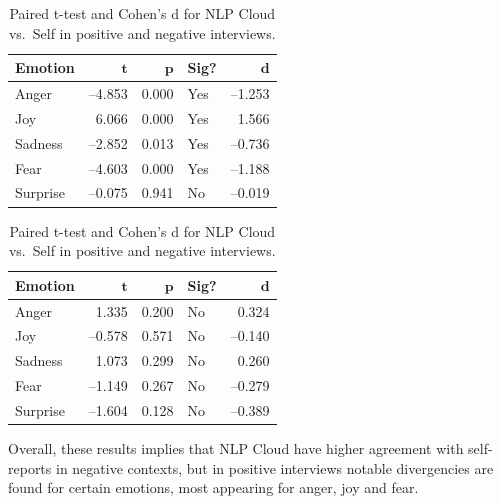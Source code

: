  \begin{table}[H]
    \centering
  
    \begin{subtable}{0.45\textwidth}
      \centering
      \caption{Positive Recordings}\label{tab:rq3_t_nlp_self_pos}
      \begin{tabular}{l r r l r}
        \toprule
        \textbf{Emotion} & \(\mathbf{t}\) & \(\mathbf{p}\) & \textbf{Sig?} & \(\mathbf{d}\) \\
        \midrule
        Anger    & –4.853 & 0.000 & Yes & –1.253 \\
        Joy      &  6.066 & 0.000 & Yes &  1.566 \\
        Sadness  & –2.852 & 0.013 & Yes & –0.736 \\
        Fear     & –4.603 & 0.000 & Yes & –1.188 \\
        Surprise & –0.075 & 0.941 & No  & –0.019 \\
        \bottomrule
      \end{tabular}
    \end{subtable}\hfill
    \begin{subtable}{0.45\textwidth}
      \centering
      \caption{Negative Recordings}\label{tab:rq3_t_nlp_self_neg}
      \begin{tabular}{l r r l r}
        \toprule
        \textbf{Emotion} & \(\mathbf{t}\) & \(\mathbf{p}\) & \textbf{Sig?} & \(\mathbf{d}\) \\
        \midrule
        Anger    &  1.335 & 0.200 & No  &  0.324 \\
        Joy      & –0.578 & 0.571 & No  & –0.140 \\
        Sadness  &  1.073 & 0.299 & No  &  0.260 \\
        Fear     & –1.149 & 0.267 & No  & –0.279 \\
        Surprise & –1.604 & 0.128 & No  & –0.389 \\
        \bottomrule
      \end{tabular}
    \end{subtable}
  
    \caption{Paired t-test and Cohen’s d for NLP Cloud vs.\ Self in positive and negative interviews.}
    \label{tab:rq3_t_nlp_self_side_by_side}
  \end{table}

Overall, these results implies that NLP Cloud have higher agreement with self-reports in negative contexts, but in positive interviews notable divergencies are found for certain emotions, most appearing for anger, joy and fear.


